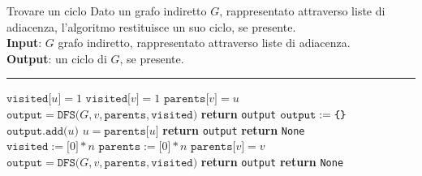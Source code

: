 \documentclass[a4paper, 12pt]{report}
\begin{document}
    \begin{framedalgo}[label={findCycleNonDir}, breakable]{Trovare un ciclo}
        Dato un grafo indiretto $G$, rappresentato attraverso liste di adiacenza, l'algoritmo restituisce un suo ciclo, se presente.\\
        \textbf{Input}: $G$ grafo indiretto, rappresentato attraverso liste di adiacenza.\\
        \textbf{Output}: un ciclo di $G$, se presente.

        \hrule
        \begin{algorithmic}[1]
                \State $\texttt{visited[}u\texttt{]} = 1$
                        \State $\texttt{visited[}v\texttt{]} = 1$
                        \State $\texttt{parents[}v\texttt{]} = u$
                        \State $\texttt{output} = \texttt{DFS(}G, v, \texttt{parents}, \texttt{visited)}$
                            \State \textbf{return} \texttt{output}
                        \EndIf
                     
                        \State $\texttt{output} := \verb|{| \verb|}|$
                            \State $\texttt{output.add(}u\texttt{)}$
                            \State $u = \texttt{parents[}u\texttt{]}$
                        \EndWhile
                        \State \textbf{return} \texttt{output}
                    \EndIf
                \EndFor
                \State \textbf{return} \texttt{None}
            \EndFunction
            \\
                \State $\texttt{visited} := \texttt{[}0\texttt{]} * n$
                \State $\texttt{parents} := \texttt{[}0\texttt{]} * n$
                        \State $\texttt{parents[}v\texttt{]} = v$ 
                        \State $\texttt{output} = \texttt{DFS(}G, v, \texttt{parents}, \texttt{visited)}$
                            \State \textbf{return} \texttt{output}
                        \EndIf
                    \EndIf
                \EndFor
                \State \textbf{return} \texttt{None}
            \EndFunction
        \end{algorithmic}
    \end{framedalgo}
\end{document}
